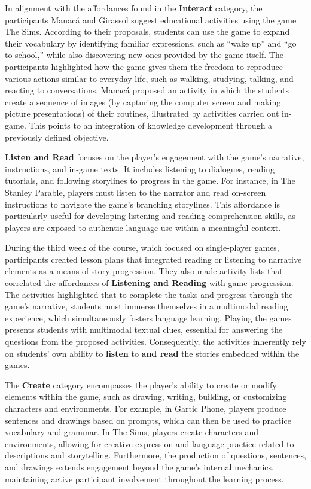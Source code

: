 \documentclass[english]{textolivre}
\begin{document}
In alignment with the affordances found in the \textbf{Interact} category, the participants Manacá and Girassol suggest educational activities using the game The Sims. According to their proposals, students can use the game to expand their vocabulary by identifying familiar expressions, such as “wake up” and “go to school,” while also discovering new ones provided by the game itself. The participants highlighted how the game gives them the freedom to reproduce various actions similar to everyday life, such as walking, studying, talking, and reacting to conversations. Manacá proposed an activity in which the students create a sequence of images (by capturing the computer screen and making picture presentations) of their routines, illustrated by activities carried out in-game. This points to an integration of knowledge development through a previously defined objective.

\textbf{Listen and Read} focuses on the player’s engagement with the game’s narrative, instructions, and in-game texts. It includes listening to dialogues, reading tutorials, and following storylines to progress in the game. For instance, in The Stanley Parable, players must listen to the narrator and read on-screen instructions to navigate the game’s branching storylines. This affordance is particularly useful for developing listening and reading comprehension skills, as players are exposed to authentic language use within a meaningful context.

During the third week of the course, which focused on single-player games, participants created lesson plans that integrated reading or listening to narrative elements as a means of story progression. They also made activity lists that correlated the affordances of \textbf{Listening and Reading} with game progression. The activities highlighted that to complete the tasks and progress through the game’s narrative, students must immerse themselves in a multimodal reading experience, which simultaneously fosters language learning. Playing the games presents students with multimodal textual clues, essential for answering the questions from the proposed activities. Consequently, the activities inherently rely on students’ own ability to \textbf{listen} to \textbf{and read} the stories embedded within the games.

The \textbf{Create} category encompasses the player’s ability to create or modify elements within the game, such as drawing, writing, building, or customizing characters and environments. For example, in Gartic Phone, players produce sentences and drawings based on prompts, which can then be used to practice vocabulary and grammar. In The Sims, players create characters and environments, allowing for creative expression and language practice related to descriptions and storytelling. Furthermore, the production of questions, sentences, and drawings extends engagement beyond the game’s internal mechanics, maintaining active participant involvement throughout the learning process.
\end{document}

